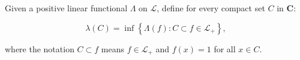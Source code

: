 Given a positive linear functional $\Lambda$ on $\mathcal{L}$, define for every compact set $C$ in $\mathbf{C}$:

$$\lambda(C) = \inf \left\{ \Lambda(f) : C \subset f \in \mathcal{L}_+ \right\},$$

where the notation $C \subset f$ means $f \in \mathcal{L}_+$ and $f(x) = 1$ for all $x \in C$.
